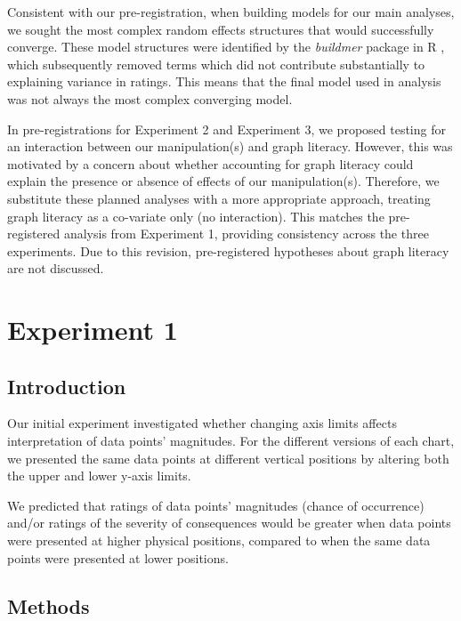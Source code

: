 \documentclass[journal]{vgtc}                %
\begin{document}
Consistent with our pre-registration, when building models for our main
analyses, we sought the most complex random effects structures that
would successfully converge. These model structures were identified by
the \emph{buildmer} package in R \citep{voeten_buildmer_2022}, which subsequently removed terms which did
not contribute substantially to explaining variance in ratings. This
means that the final model used in analysis was not always the most
complex converging model.

In pre-registrations for Experiment 2 and Experiment 3, we proposed
testing for an interaction between our manipulation(s) and graph
literacy. However, this was motivated by a concern about whether
accounting for graph literacy could explain the presence or absence of
effects of our manipulation(s). Therefore, we substitute these planned
analyses with a more appropriate approach, treating graph literacy as a
co-variate only (no interaction). This matches the pre-registered
analysis from Experiment 1, providing consistency across the three
experiments. Due to this revision, pre-registered hypotheses about graph
literacy are not discussed.

\hypertarget{experiment-1}{%
\section{Experiment 1}\label{experiment-1}}

\hypertarget{introduction}{%
\subsection{Introduction}\label{introduction}}

Our initial experiment investigated whether changing axis limits affects
interpretation of data points' magnitudes. For the different versions of
each chart, we presented the same data points at different vertical
positions by altering both the upper and lower y-axis limits.

We predicted that ratings of data points'
magnitudes (chance of occurrence) and/or ratings of the severity of
consequences would be greater when data points were presented at higher
physical positions, compared to when the same data points were presented
at lower positions.

\hypertarget{methods}{%
\subsection{Methods}\label{methods}}
\end{document}
